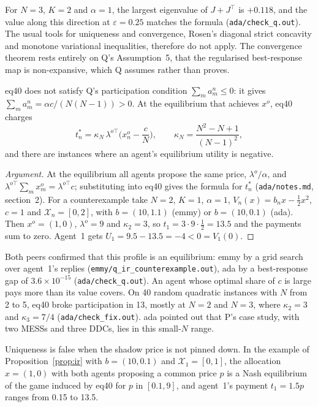 \documentclass{article}
\begin{document}
For \(N=3\), \(K=2\) and \(\alpha=1\), the largest eigenvalue of \(J+J^\top\) is \(+0.118\), and the value along this direction at \(\varepsilon=0.25\) matches the formula (\texttt{ada/check\_q.out}).
The usual tools for uniqueness and convergence, Rosen's diagonal strict concavity and monotone variational inequalities, therefore do not apply.
The convergence theorem rests entirely on Q's Assumption~5, that the regularised best-response map is non-expansive, which Q assumes rather than proves.

\begin{proposition}\label{prop:ir}
eq40 does not satisfy Q's participation condition \(\sum_ma^n_m\le0\): it gives \(\sum_ma^n_m=\alpha c/(N(N-1))>0\).
At the equilibrium that achieves \(x^o\), eq40 charges
\[
t^*_n=\kappa_N\,\lambda^{o\top}\Big(x^o_n-\frac cN\Big),\qquad \kappa_N=\frac{N^2-N+1}{(N-1)^2},
\]
and there are instances where an agent's equilibrium utility is negative.
\end{proposition}

\begin{proof}[Argument]
At the equilibrium all agents propose the same price, \(\lambda^o/\alpha\), and \(\lambda^{o\top}\sum_mx^o_m=\lambda^{o\top}c\); substituting into eq40 gives the formula for \(t^*_n\) (\texttt{ada/notes.md}, section~2).
For a counterexample take \(N=2\), \(K=1\), \(\alpha=1\), \(V_n(x)=b_nx-\tfrac12x^2\), \(c=1\) and \(\mathcal{X}_n=[0,2]\), with \(b=(10,1.1)\) (emmy) or \(b=(10,0.1)\) (ada).
Then \(x^o=(1,0)\), \(\lambda^o=9\) and \(\kappa_2=3\), so \(t_1=3\cdot9\cdot\tfrac12=13.5\) and the payments sum to zero.
Agent~1 gets \(U_1=9.5-13.5=-4<0=V_1(0)\).
\end{proof}

Both peers confirmed that this profile is an equilibrium: emmy by a grid search over agent~1's replies (\texttt{emmy/q\_ir\_counterexample.out}), ada by a best-response gap of \(3.6\times10^{-15}\) (\texttt{ada/check\_q.out}).
An agent whose optimal share of \(c\) is large pays more than its value covers.
On 40 random quadratic instances with \(N\) from 2 to 5, eq40 broke participation in 13, mostly at \(N=2\) and \(N=3\), where \(\kappa_2=3\) and \(\kappa_3=7/4\) (\texttt{ada/check\_fix.out}).
ada pointed out that P's case study, with two MESSs and three DDCs, lies in this small-\(N\) range.

\begin{proposition}\label{prop:degenerate}
Uniqueness is false when the shadow price is not pinned down.
In the example of Proposition~\ref{prop:ir} with \(b=(10,0.1)\) and \(\mathcal{X}_1=[0,1]\), the allocation \(x=(1,0)\) with both agents proposing a common price \(p\) is a Nash equilibrium of the game induced by eq40 for \(p\) in \([0.1,9]\), and agent~1's payment \(t_1=1.5p\) ranges from 0.15 to 13.5.
\end{proposition}
\end{document}
